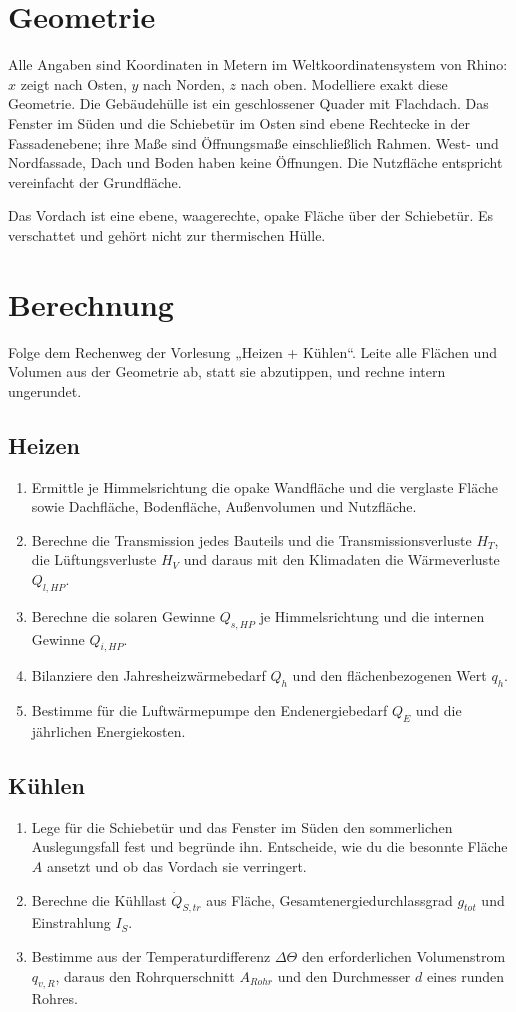 \section{Geometrie}
Alle Angaben sind Koordinaten in Metern im Weltkoordinatensystem von Rhino: $x$ zeigt nach Osten, $y$ nach Norden, $z$ nach oben. Modelliere exakt diese Geometrie.
\EnergyAxonometryFigure
\EnergyElements
Die Gebäudehülle ist ein geschlossener Quader mit Flachdach. Das Fenster im Süden und die Schiebetür im Osten sind ebene Rechtecke in der Fassadenebene; ihre Maße sind Öffnungsmaße einschließlich Rahmen. West- und Nordfassade, Dach und Boden haben keine Öffnungen. Die Nutzfläche entspricht vereinfacht der Grundfläche.

Das Vordach ist eine ebene, waagerechte, opake Fläche über der Schiebetür. Es verschattet und gehört nicht zur thermischen Hülle.
\section{Berechnung}
Folge dem Rechenweg der Vorlesung „Heizen + Kühlen“. Leite alle Flächen und Volumen aus der Geometrie ab, statt sie abzutippen, und rechne intern ungerundet.
\subsection{Heizen}
\begin{enumerate}
\item Ermittle je Himmelsrichtung die opake Wandfläche und die verglaste Fläche sowie Dachfläche, Bodenfläche, Außenvolumen und Nutzfläche.
\item Berechne die Transmission jedes Bauteils und die Transmissionsverluste $H_T$, die Lüftungsverluste $H_V$ und daraus mit den Klimadaten die Wärmeverluste $Q_{l,HP}$.
\item Berechne die solaren Gewinne $Q_{s,HP}$ je Himmelsrichtung und die internen Gewinne $Q_{i,HP}$.
\item Bilanziere den Jahresheizwärmebedarf $Q_h$ und den flächenbezogenen Wert $q_h$.
\item Bestimme für die Luftwärmepumpe den Endenergiebedarf $Q_E$ und die jährlichen Energiekosten.
\end{enumerate}
\subsection{Kühlen}
\begin{enumerate}
\item Lege für die Schiebetür und das Fenster im Süden den sommerlichen Auslegungsfall fest und begründe ihn. Entscheide, wie du die besonnte Fläche $A$ ansetzt und ob das Vordach sie verringert.
\item Berechne die Kühllast $\dot Q_{S,tr}$ aus Fläche, Gesamtenergiedurchlassgrad $g_{tot}$ und Einstrahlung $I_S$.
\item Bestimme aus der Temperaturdifferenz $\Delta\Theta$ den erforderlichen Volumenstrom $q_{v,R}$, daraus den Rohrquerschnitt $A_{Rohr}$ und den Durchmesser $d$ eines runden Rohres.
\end{enumerate}
